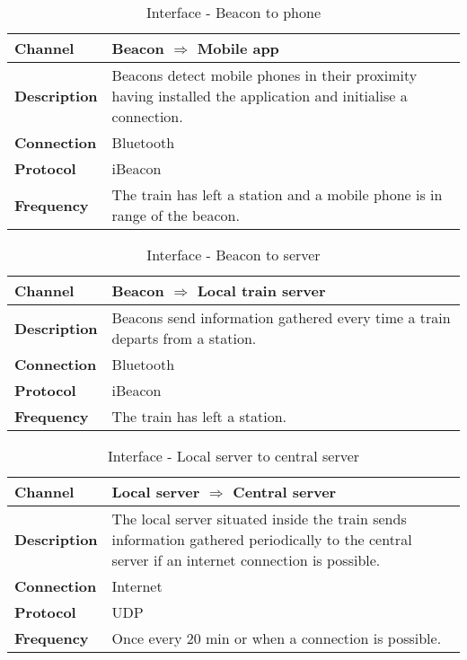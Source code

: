 
\begin{table}[H]
  \centering
  \begin{tabularx}{\linewidth}{l|X}
    \textbf{Channel}      & Beacon $\Rightarrow$ Mobile app \\ \hline
    \textbf{Description}  & Beacons detect mobile phones in their proximity having installed the application and initialise a connection.\\ \hline
    \textbf{Connection}   & Bluetooth \\ \hline
    \textbf{Protocol}     & iBeacon \\ \hline
    \textbf{Frequency}    & The train has left a station and a mobile phone is in range of the beacon. \\ \hline
  \end{tabularx}
  \caption{Interface - Beacon to phone}
  \label{tbl:beacon_to_phone}
\end{table}

\begin{table}[H]
	\centering
	\begin{tabularx}{\linewidth}{l|X}
		\textbf{Channel}      & Beacon $\Rightarrow$ Local train server \\ \hline
		\textbf{Description}  & Beacons send information gathered every time a train departs from a station.\\ \hline
		\textbf{Connection}   & Bluetooth \\ \hline
		\textbf{Protocol}     & iBeacon \\ \hline
		\textbf{Frequency}    & The train has left a station. \\ \hline
	\end{tabularx}
	\caption{Interface - Beacon to server}
	\label{tbl:beacon_to_server}
\end{table}

\begin{table}[H]
	\centering
	\begin{tabularx}{\linewidth}{l|X}
		\textbf{Channel}      & Local server $\Rightarrow$ Central server \\ \hline
		\textbf{Description}  & The local server situated inside the train sends information gathered periodically to the central server if an internet connection is possible.\\ \hline
		\textbf{Connection}   & Internet \\ \hline
		\textbf{Protocol}     & UDP \\ \hline
		\textbf{Frequency}    & Once every 20 min or when a connection is possible. \\ \hline
	\end{tabularx}
	\caption{Interface - Local server to central server}
	\label{tbl:local_to_central}
\end{table}